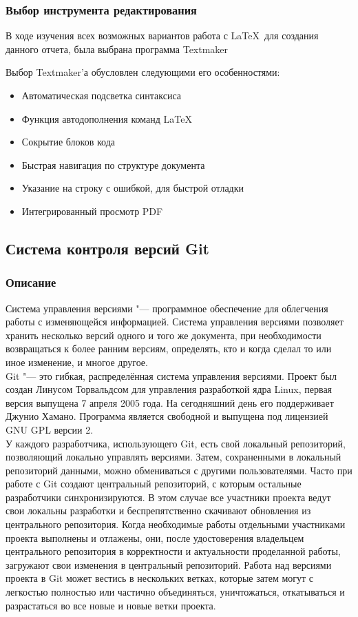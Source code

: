 \documentclass{article}
\begin{document}
		\subsubsection{Выбор инструмента редактирования}
			В ходе изучения всех возможных вариантов работа с \LaTeX ~для создания данного отчета, была выбрана программа Textmaker
			
			Выбор Textmaker'а обусловлен следующими его особенностями:
			\begin{itemize} 
	    		\item	Автоматическая подсветка синтаксиса
	    		\item	Функция автодополнения команд \LaTeX
	    		\item	Сокрытие блоков кода 
	    		\item	Быстрая навигация по структуре документа
	    		\item	Указание на строку с ошибкой, для быстрой отладки
	    		\item	Интегрированный просмотр PDF
			\end{itemize} 
	\newpage
	\subsection{Система контроля версий Git}
		\subsubsection{Описание}
		Система управления версиями "--- программное обеспечение для облегчения работы с изменяющейся информацией. Система управления версиями позволяет хранить несколько версий одного и того же документа, при необходимости возвращаться к более ранним версиям, определять, кто и когда сделал то или иное изменение, и многое другое.\\
		
		Git "--- это гибкая, распределённая система управления версиями. Проект был создан Линусом Торвальдсом для управления разработкой ядра Linux, первая версия выпущена 7 апреля 2005 года. На сегодняшний день его поддерживает Джунио Хамано. Программа является свободной и выпущена под лицензией GNU GPL версии 2.\\ 
		
	У каждого разработчика, использующего Git, есть свой локальный репозиторий, позволяющий локально управлять версиями. Затем, сохраненными в локальный репозиторий данными, можно обмениваться с другими пользователями. Часто при работе с Git создают центральный репозиторий, с которым остальные разработчики синхронизируются. В этом случае все участники проекта ведут свои локальны разработки и беспрепятственно скачивают обновления из центрального репозитория. Когда необходимые работы отдельными участниками проекта выполнены и отлажены, они, после удостоверения владельцем центрального репозитория в корректности и актуальности проделанной работы, загружают свои изменения в центральный репозиторий. Работа над версиями проекта в Git может вестись в нескольких ветках, которые затем могут с легкостью полностью или частично объединяться, уничтожаться, откатываться и разрастаться во все новые и новые ветки проекта.\\
\end{document}
